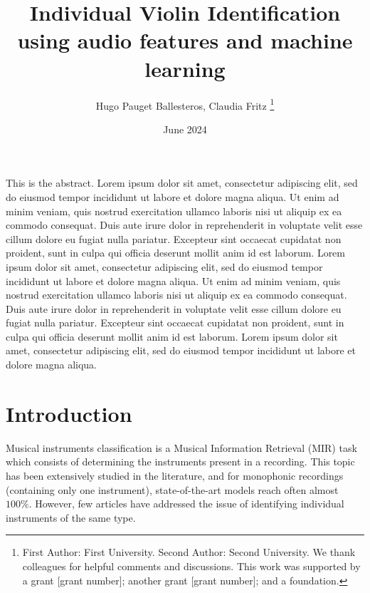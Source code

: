 \documentclass[letterpaper,11pt,leqno]{article}
\begin{document}
\title{Individual Violin Identification using audio features and machine learning}

\author{Hugo Pauget Ballesteros, Claudia Fritz
%
\thanks{First Author: First University. Second Author: Second University. We thank colleagues for helpful comments and discussions. This work was supported by a grant [grant number]; another grant [grant number]; and a foundation.}}

\date{June 2024}   

\begin{titlepage}
\maketitle

This is the abstract. Lorem ipsum dolor sit amet, consectetur adipiscing elit, sed do eiusmod tempor incididunt ut labore et dolore magna aliqua. Ut enim ad minim veniam, quis nostrud exercitation ullamco laboris nisi ut aliquip ex ea commodo consequat. Duis aute irure dolor in reprehenderit in voluptate velit esse cillum dolore eu fugiat nulla pariatur. Excepteur sint occaecat cupidatat non proident, sunt in culpa qui officia deserunt mollit anim id est laborum. Lorem ipsum dolor sit amet, consectetur adipiscing elit, sed do eiusmod tempor incididunt ut labore et dolore magna aliqua. Ut enim ad minim veniam, quis nostrud exercitation ullamco laboris nisi ut aliquip ex ea commodo consequat. Duis aute irure dolor in reprehenderit in voluptate velit esse cillum dolore eu fugiat nulla pariatur. Excepteur sint occaecat cupidatat non proident, sunt in culpa qui officia deserunt mollit anim id est laborum. Lorem ipsum dolor sit amet, consectetur adipiscing elit, sed do eiusmod tempor incididunt ut labore et dolore magna aliqua.

\end{titlepage}

\section{Introduction}\label{s:introduction}
 
Musical instruments classification is a Musical Information Retrieval (MIR) task which consists of determining the instruments present in a recording. This topic has been extensively studied in the literature, and for monophonic recordings (containing only one instrument), state-of-the-art models reach often almost $100\%$. However, few articles have addressed the issue of identifying individual instruments of the same type.
\end{document}
